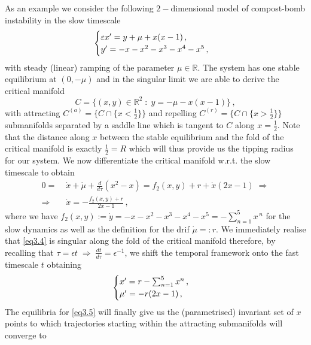 \documentclass[../main.tex]{subfiles}
\begin{document}
\begin{example}[label=ex3.2]{}{}
As an example we consider the following $2-$dimensional model of compost-bomb instability \cite{Wieczorek11} in the slow timescale
\begin{equation*}
        \begin{cases}
            \varepsilon x' = y + \mu + x(x-1)\,, \\
            y' = - x - x^2 - x^{3} - x^{4} - x^{5}\,,
        \end{cases}
\end{equation*}
with steady (linear) ramping of the parameter $\mu\in \mathbb{R}$.
The system has one stable equilibrium at $(0,-\mu)$ and in the singular limit we are able to derive the critical manifold 
\begin{equation*}
            C=\{(x,y)\in \mathbb{R}^{2}\;:\;y=-\mu-x(x-1)\}\,,
\end{equation*}
with attracting $C^{(a)}=\{C\cap\{x<\frac{1}{2}\}\}$ and repelling $C^{(r)}=\{C\cap\{x>\frac{1}{2}\}\}$ submanifolds separated by a saddle line which is tangent to $C$ along $x=\frac{1}{2}$. Note that the distance along $x$ between the stable equilibrium and the fold of the critical manifold is exactly $\frac{1}{2}=R$ which will thus provide us the tipping radius for our system.
We now differentiate the critical manifold w.r.t. the slow timescale to obtain
\begin{align}
        0 =&\;\dot{x} + \dot{\mu} + \frac{d}{d\tau}(x^{2}-x) = f_{2}(x, y) + r + \dot{x}(2x-1)\;\Rightarrow \nonumber \\
        \Rightarrow&\;\dot{x}=-\frac{f_{2}(x, y)+r}{2x-1} \,, \label{eq3.4}
\end{align}
where we have $f_{2}(x, y):=\dot{y}=- x - x^{2} - x^{3} - x^{4} - x^{5} = -\sum_{n=1}^{5}x^{\,n}$ for the slow dynamics as well as the definition for the drif $\dot{\mu} =: r$.
We immediately realise that \eqref{eq3.4} is singular along the fold of the critical manifold therefore, by recalling that $\tau = \epsilon t\;\Rightarrow\;\frac{dt}{d\tau}=\epsilon^{-1}$, we shift the temporal framework onto the fast timescale $t$ obtaining
\begin{equation}\label{eq3.5}
   \begin{cases}
      x' = r - \sum_{n=1}^{5}x^{n}  \,, \\
      \mu' = -r(2x-1) \,, 
   \end{cases}
\end{equation}
The equilibria for \eqref{eq3.5} will finally give us the (parametrised) invariant set of $x$ points to which trajectories starting within the attracting submanifolds will converge to

\end{example}
\end{document}
